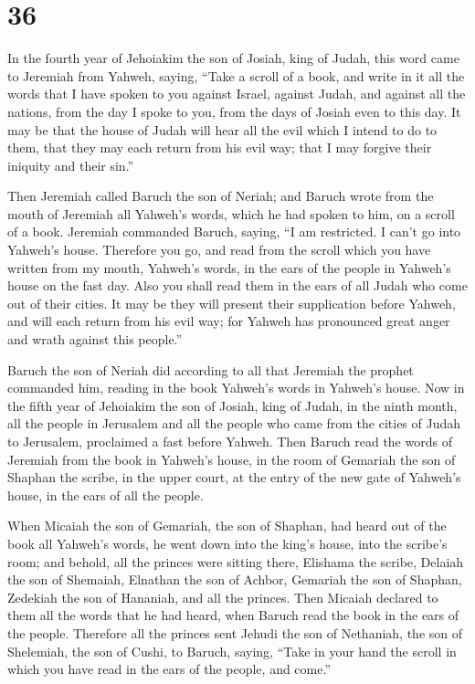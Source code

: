 \hypertarget{section-35}{%
\section{36}\label{section-35}}

 In the fourth year of Jehoiakim the son of Josiah, king
of Judah, this word came to Jeremiah from Yahweh, saying, 
``Take a scroll of a book, and write in it all the words that I have
spoken to you against Israel, against Judah, and against all the
nations, from the day I spoke to you, from the days of Josiah even to
this day.  It may be that the house of Judah will hear all
the evil which I intend to do to them, that they may each return from
his evil way; that I may forgive their iniquity and their sin.''

 Then Jeremiah called Baruch the son of Neriah; and Baruch
wrote from the mouth of Jeremiah all Yahweh's words, which he had spoken
to him, on a scroll of a book.  Jeremiah commanded Baruch,
saying, ``I am restricted. I can't go into Yahweh's house.
 Therefore you go, and read from the scroll which you have
written from my mouth, Yahweh's words, in the ears of the people in
Yahweh's house on the fast day. Also you shall read them in the ears of
all Judah who come out of their cities.  It may be they
will present their supplication before Yahweh, and will each return from
his evil way; for Yahweh has pronounced great anger and wrath against
this people.''

 Baruch the son of Neriah did according to all that
Jeremiah the prophet commanded him, reading in the book Yahweh's words
in Yahweh's house.  Now in the fifth year of Jehoiakim the
son of Josiah, king of Judah, in the ninth month, all the people in
Jerusalem and all the people who came from the cities of Judah to
Jerusalem, proclaimed a fast before Yahweh.  Then Baruch
read the words of Jeremiah from the book in Yahweh's house, in the room
of Gemariah the son of Shaphan the scribe, in the upper court, at the
entry of the new gate of Yahweh's house, in the ears of all the people.

 When Micaiah the son of Gemariah, the son of Shaphan,
had heard out of the book all Yahweh's words,  he went
down into the king's house, into the scribe's room; and behold, all the
princes were sitting there, Elishama the scribe, Delaiah the son of
Shemaiah, Elnathan the son of Achbor, Gemariah the son of Shaphan,
Zedekiah the son of Hananiah, and all the princes.  Then
Micaiah declared to them all the words that he had heard, when Baruch
read the book in the ears of the people.  Therefore all
the princes sent Jehudi the son of Nethaniah, the son of Shelemiah, the
son of Cushi, to Baruch, saying, ``Take in your hand the scroll in which
you have read in the ears of the people, and come.''

